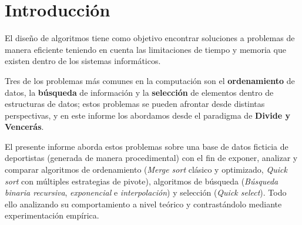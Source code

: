 \section{Introducción}\label{sec:introduccion}

El diseño de algoritmos tiene como objetivo encontrar soluciones a problemas de manera eficiente teniendo en cuenta las limitaciones de tiempo y memoria que existen dentro de los sistemas informáticos.

Tres de los problemas más comunes en la computación son el \textbf{ordenamiento} de datos, la \textbf{búsqueda} de información y la \textbf{selección} de elementos dentro de estructuras de datos; estos problemas se pueden afrontar desde distintas perspectivas, y en este informe los abordamos desde el paradigma de \textbf{Divide y Vencerás}.

El presente informe aborda estos problemas sobre una base de datos ficticia de deportistas (generada de manera procedimental) con el fin de exponer, analizar y comparar algoritmos de ordenamiento (\textit{Merge sort} clásico y optimizado, \textit{Quick sort} con múltiples estrategias de pivote), algoritmos de búsqueda (\textit{Búsqueda binaria recursiva}, \textit{exponencial} e \textit{interpolación}) y selección (\textit{Quick select}). Todo ello analizando su comportamiento a nivel teórico y contrastándolo mediante experimentación empírica.
